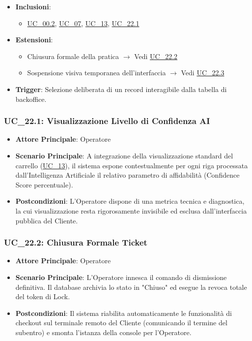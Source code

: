 \begin{itemize}
\begin{itemize}
        \item L'Operatore assume e mantiene il pieno controllo asincrono (Lock) sui dati di sessione del Cliente.
    \end{itemize}
    \item \textbf{Inclusioni}:
    \begin{itemize}
        \item \hyperref[uc_00.2]{UC\_00.2}, \hyperref[uc_07]{UC\_07}, \hyperref[uc_13]{UC\_13}, \hyperref[uc_22.1]{UC\_22.1}
    \end{itemize}
    \item \textbf{Estensioni}:
    \begin{itemize}
        \item Chiusura formale della pratica $\rightarrow$ Vedi \hyperref[uc_22.2]{UC\_22.2}
        \item Sospensione visiva temporanea dell'interfaccia $\rightarrow$ Vedi \hyperref[uc_22.3]{UC\_22.3}
    \end{itemize}
    \item \textbf{Trigger}: Selezione deliberata di un record interagibile dalla tabella di backoffice.
\end{itemize}

\subsubsection{UC\_22.1: Visualizzazione Livello di Confidenza AI}
\label{uc_22.1}
\begin{itemize}
    \item \textbf{Attore Principale}: Operatore
    \item \textbf{Scenario Principale}: A integrazione della visualizzazione standard del carrello (\hyperref[uc_13]{UC\_13}), il sistema espone contestualmente per ogni riga processata dall'Intelligenza Artificiale il relativo parametro di affidabilità (Confidence Score percentuale).
    \item \textbf{Postcondizioni}: L'Operatore dispone di una metrica tecnica e diagnostica, la cui visualizzazione resta rigorosamente invisibile ed esclusa dall'interfaccia pubblica del Cliente.
\end{itemize}

\subsubsection{UC\_22.2: Chiusura Formale Ticket}
\label{uc_22.2}
\begin{itemize}
    \item \textbf{Attore Principale}: Operatore
    \item \textbf{Scenario Principale}: L'Operatore innesca il comando di dismissione definitiva. Il database archivia lo stato in "Chiuso" ed esegue la revoca totale del token di Lock.
    \item \textbf{Postcondizioni}: Il sistema riabilita automaticamente le funzionalità di checkout sul terminale remoto del Cliente (comunicando il termine del subentro) e smonta l'istanza della console per l'Operatore.
\end{itemize}

